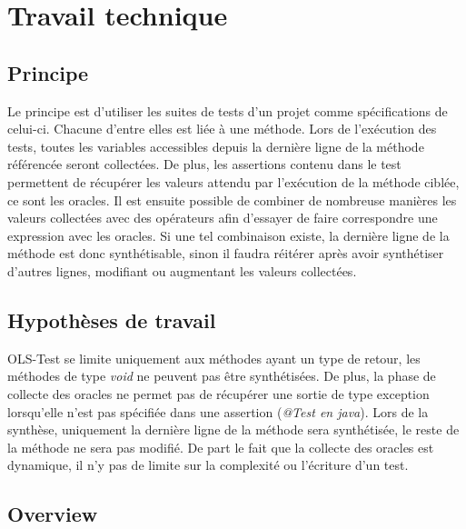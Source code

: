 

\chapter{Travail technique}
	\thispagestyle{document}
	
\section{Principe}
\label{sec:principe}

\par Le principe est d'utiliser les suites de tests d'un projet comme spécifications de celui-ci. Chacune d'entre elles est liée à une méthode. Lors de l'exécution des tests, toutes les variables accessibles depuis la dernière ligne de la méthode référencée seront collectées. De plus, les assertions contenu dans le test permettent de récupérer les valeurs attendu par l'exécution de la méthode ciblée, ce sont les oracles. Il est ensuite possible de combiner de nombreuse manières les valeurs collectées avec des opérateurs afin d'essayer de faire correspondre une expression avec les oracles. Si une tel combinaison existe, la dernière ligne de la méthode est donc synthétisable, sinon il faudra réitérer après avoir synthétiser d'autres lignes, modifiant ou augmentant les valeurs collectées.

\section{Hypothèses de travail}
\label{sec:hypotheses}


\par OLS-Test se limite uniquement aux méthodes ayant un type de retour, les méthodes de type \textit{void} ne peuvent pas être synthétisées. De plus, la phase de collecte des oracles ne permet pas de récupérer une sortie de type exception lorsqu'elle n'est pas spécifiée dans une assertion (\textit{@Test en java}). Lors de la synthèse, uniquement la dernière ligne de la méthode sera synthétisée, le reste de la méthode ne sera pas modifié. De part le fait que la collecte des oracles est dynamique, il n'y pas de limite sur la complexité ou l'écriture d'un test.



\section{Overview}
\label{sec:overview}

